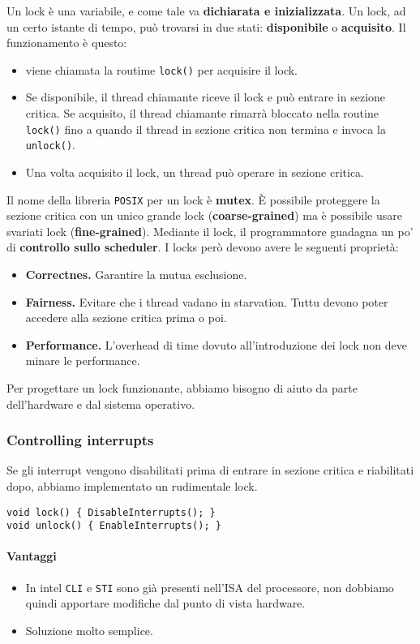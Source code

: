 \documentclass[12pt, twoside, letterpaper]{article}
\begin{document}
			Un lock è una variabile, e come tale va \textbf{dichiarata e inizializzata}. Un lock, ad un certo istante di tempo, può trovarsi in due stati: \textbf{disponibile} o \textbf{acquisito}. Il funzionamento è questo:
			\begin{itemize}
				\item viene chiamata la routime \texttt{lock()} per acquisire il lock.
				\item Se disponibile, il thread chiamante riceve il lock e può entrare in sezione critica. Se acquisito, il thread chiamante rimarrà bloccato nella routine \texttt{lock()} fino a quando il thread in sezione critica non termina e invoca la \texttt{unlock()}.
				\item Una volta acquisito il lock, un thread può operare in sezione critica. 
			\end{itemize}
			Il nome della libreria \texttt{POSIX} per un lock è \textbf{mutex}. È possibile proteggere la sezione critica con un unico grande lock (\textbf{coarse-grained}) ma è possibile usare svariati lock (\textbf{fine-grained}). Mediante il lock, il programmatore guadagna un po' di \textbf{controllo sullo scheduler}. I locks però devono avere le seguenti proprietà:
			\begin{itemize}
				\item \textbf{Correctnes.} Garantire la mutua esclusione.
				\item \textbf{Fairness.} Evitare che i thread vadano in starvation. Tuttu devono poter accedere alla sezione critica prima o poi.
				\item \textbf{Performance.} L'overhead di time dovuto all'introduzione dei lock non deve minare le performance. 
			\end{itemize}
			Per progettare un lock funzionante, abbiamo bisogno di aiuto da parte dell'hardware e dal sistema operativo.
			\subsubsection{Controlling interrupts}
				Se gli interrupt vengono disabilitati prima di entrare in sezione critica e riabilitati dopo, abbiamo implementato un rudimentale lock.
				\begin{lstlisting}[style=CStyle]
void lock() { DisableInterrupts(); }
void unlock() { EnableInterrupts(); } \end{lstlisting}	
				
				\paragraph{Vantaggi}
					\begin{itemize}
						\item In intel \texttt{CLI} e \texttt{STI} sono già presenti nell'ISA del processore, non dobbiamo quindi apportare modifiche dal punto di vista hardware.
						\item Soluzione molto semplice.
					\end{itemize}
\end{document}
